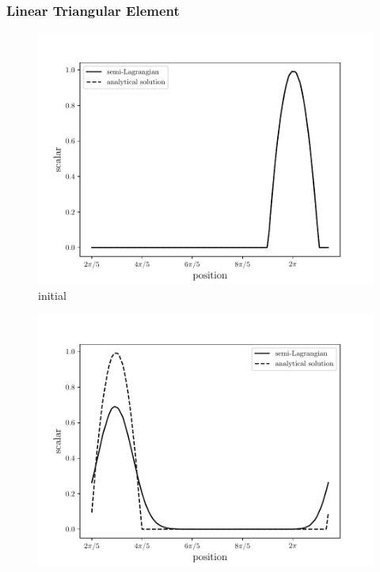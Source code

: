 \begin{frame} 
 \frametitle{\normalsize Linear Triangular Element}
\vspace{-1.0cm}
\begin{center}
\begin{figure}[H]
     \centering
     \begin{minipage}{.5\linewidth}
      \centering
      \includegraphics[scale=0.33]{./images/SLlinear0.pdf}\\
      \tiny initial 
     \end{minipage}%
     \begin{minipage}{.5\linewidth}
      \centering
      \includegraphics[scale=0.33]{./images/SLlinear1.pdf}\\

\end{minipage}
\end{figure}
\end{center}
\end{frame}
